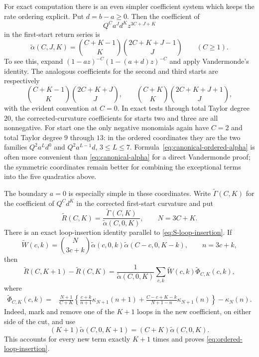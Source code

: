 \documentclass[11pt]{article}
\theoremstyle{remark}
\begin{document}
For exact computation there is an even simpler coefficient system which
keeps the rate ordering explicit.  Put $d=b-a\geq0$.  Then the coefficient
of
\[
 Q^Ca^Jd^Kz^{3C+J+K}
\]
in the first-start return series is
\begin{equation}\label{eq:canonical-ordered-alpha}
 \widetilde\alpha(C,J,K)=
 \binom{C+K-1}{K}\binom{2C+K+J-1}{J}
 \qquad(C\geq1).
\end{equation}
To see this, expand
$(1-az)^{-C}(1-(a+d)z)^{-C}$ and apply Vandermonde's identity.
The analogous coefficients for the second and third starts are respectively
\[
 \binom{C+K-1}{K}\binom{2C+K+J}{J},
 \qquad
 \binom{C+K}{K}\binom{2C+K+J+1}{J},
\]
with the evident convention at $C=0$.  In exact tests through total Taylor
degree $20$, the corrected-curvature coefficients for starts two and three
are all nonnegative.  For start one the only negative monomials again have
$C=2$ and total Taylor degree $9$ through $13$: in the ordered coordinates
they are the two families $Q^2a^Ld^0$ and $Q^2a^{L-1}d$,
$3\leq L\leq7$.  Formula~\eqref{eq:canonical-ordered-alpha} is often more
convenient than \eqref{eq:canonical-alpha} for a direct Vandermonde proof;
the symmetric coordinates remain better for combining the exceptional
terms into the five quadratics above.

The boundary $a=0$ is especially simple in these coordinates.  Write
$\widetilde\Gamma(C,K)$ for the coefficient of $Q^Cd^K$ in the corrected
first-start curvature and put
\[
 \widetilde R(C,K)=
 \frac{\widetilde\Gamma(C,K)}{\widetilde\alpha(C,0,K)},
 \qquad N=3C+K.
\]
There is an exact loop-insertion identity parallel to
\eqref{eq:S-loop-insertion}.  If
\[
 \widetilde W(c,k)=\binom N{3c+k}
 \widetilde\alpha(c,0,k)
 \widetilde\alpha(C-c,0,K-k),
 \qquad n=3c+k,
\]
then
\begin{equation}\label{eq:ordered-loop-insertion}
 \widetilde R(C,K+1)-\widetilde R(C,K)
 =\frac1{\widetilde\alpha(C,0,K)}
  \sum_{c,k}\widetilde W(c,k)\widetilde\Phi_{C,K}(c,k),
\end{equation}
where
\begin{align*}
 \widetilde\Phi_{C,K}(c,k)
 ={}&\frac{N+1}{C+K}\left\{
 \frac{c+k}{n+1}\kappa_{N+1}(n+1)
 +\frac{C-c+K-k}{N+1-n}\kappa_{N+1}(n)
 \right\}-\kappa_N(n).
\end{align*}
Indeed, mark and remove one of the $K+1$ loops in the new coefficient, on
either side of the cut, and use
\[
 (K+1)\widetilde\alpha(C,0,K+1)
 =(C+K)\widetilde\alpha(C,0,K).
\]
This accounts for every new term exactly $K+1$ times and proves
\eqref{eq:ordered-loop-insertion}.
\end{document}
